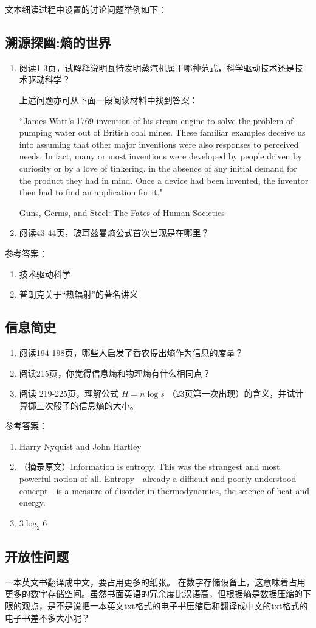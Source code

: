 \documentclass[12pt]{ctexart}
\begin{document}
文本细读过程中设置的讨论问题举例如下：


\subsection{溯源探幽:熵的世界}
\begin{enumerate}
  \item 阅读1-3页，试解释说明瓦特发明蒸汽机属于哪种范式，科学驱动技术还是技术驱动科学？

  上述问题亦可从下面一段阅读材料中找到答案：
  
  ``James Watt’s 1769 invention of his steam engine to solve the problem of pumping water out of British coal mines.
  These familiar examples deceive us into assuming that other major inventions were also responses to perceived needs. In fact, many or most inventions were developed by people driven by curiosity or by a love of tinkering, in the absence of any initial demand for the product they had in mind. Once a device had been invented, the inventor then had to find an application for it."
  \begin{flushright}
  Guns, Germs, and Steel: The Fates of Human Societies
  \end{flushright}
  \item 阅读43-44页，玻耳兹曼熵公式首次出现是在哪里？
\end{enumerate}

参考答案：
\begin{enumerate}
  \item 技术驱动科学
  \item 普朗克关于“热辐射”的著名讲义
\end{enumerate}

\subsection{信息简史}
\begin{enumerate}
  \item 阅读194-198页，哪些人启发了香农提出熵作为信息的度量？
  \item 阅读215页，你觉得信息熵和物理熵有什么相同点？
  \item 阅读 219-225页，理解公式 $H=n\log s$ （23页第一次出现）的含义，并试计算掷三次骰子的信息熵的大小。
\end{enumerate}

参考答案：
\begin{enumerate}
  \item Harry Nyquist and John Hartley
  \item （摘录原文）Information is entropy. This was the strangest and most powerful notion of all. Entropy—already a difficult and poorly understood concept—is a measure of disorder in thermodynamics, the science of heat and energy.
  \item $3\log_2 6$
\end{enumerate}


\subsection{开放性问题}
一本英文书翻译成中文，要占用更多的纸张。
在数字存储设备上，这意味着占用更多的数字存储空间。虽然书面英语的冗余度比汉语高，但根据熵是数据压缩的下限的观点，是不是说把一本英文txt格式的电子书压缩后和翻译成中文的txt格式的电子书差不多大小呢？
\end{document}
